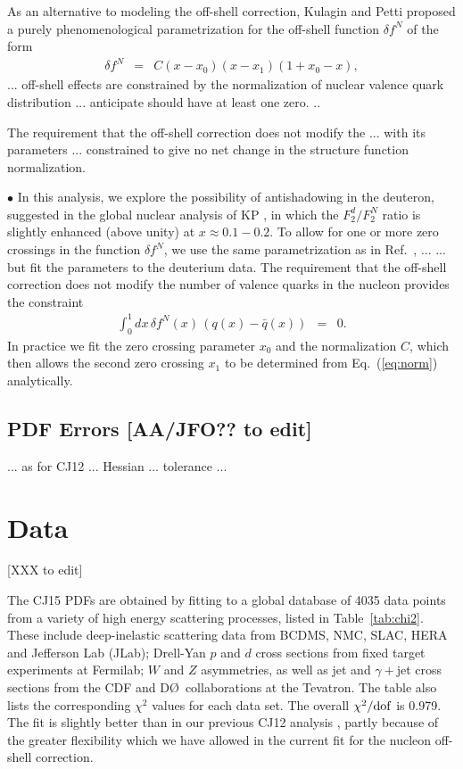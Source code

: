 \documentclass[aps,prd,amsmath,preprint]{revtex4}
\begin{document}
As an alternative to modeling the off-shell correction, Kulagin and
Petti \cite{KP06} proposed a purely phenomenological parametrization
for the off-shell function $\delta f^N$ of the form
%
\begin{eqnarray}
\delta f^N
&=& C (x-x_0) (x-x_1) (1+x_0-x),
\label{eq:delffit}
\end{eqnarray}
%
... 
off-shell effects are constrained by the normalization
of nuclear valence quark distribution ...
anticipate should have at least one zero. ..

The requirement that the off-shell correction does not modify the
... with its parameters 
... constrained to give no net change in the structure function 
normalization.


$\bullet$
In this analysis, we explore the possibility of antishadowing in the
deuteron, suggested in the global nuclear analysis of KP \cite{KP06},
in which the $F_2^d/F_2^N$ ratio is slightly enhanced (above unity)
at $x \approx 0.1-0.2$.
To allow for one or more zero crossings in the function $\delta f^N$,
we use the same parametrization as in Ref.~\cite{KP06},
%
...
%
... but fit the parameters to the deuterium data.
The requirement that the off-shell correction does not modify the
number of valence quarks in the nucleon provides the constraint
%
\begin{eqnarray}
\int_0^1 dx\, \delta f^N(x)\, (q(x)-\bar q(x)) &=& 0.
\label{eq:norm}
\end{eqnarray}
%
In practice we fit the zero crossing parameter $x_0$ and the
normalization $C$, which then allows the second zero crossing
$x_1$ to be determined from Eq.~(\ref{eq:norm}) analytically.


\subsection{PDF Errors {\color{red} [AA/JFO?? to edit]}}
\label{ssec:errors}

... as for CJ12 ... Hessian ... tolerance ...



\section{Data} {\color{red} [XXX to edit]}
\label{sec:data}

The CJ15 PDFs are obtained by fitting to a global database of 4035
data points from a variety of high energy scattering processes,
listed in Table~\ref{tab:chi2}.
These include
  deep-inelastic scattering data from BCDMS, NMC, SLAC, HERA and
Jefferson Lab (JLab);
  Drell-Yan $p$ and $d$ cross sections from fixed target experiments
at Fermilab;
  $W$ and $Z$ asymmetries, as well as jet and $\gamma+$jet cross
sections from the CDF and D\O\ collaborations at the Tevatron.
%
The table also lists the corresponding $\chi^2$ values for each
data set.  The overall $\chi^2/{\rm dof}$ is 0.979.
The fit is slightly better than in our previous CJ12 analysis
\cite{CJ12}, partly because of the greater flexibility which
we have allowed in the current fit for the nucleon off-shell
correction.
\end{document}
